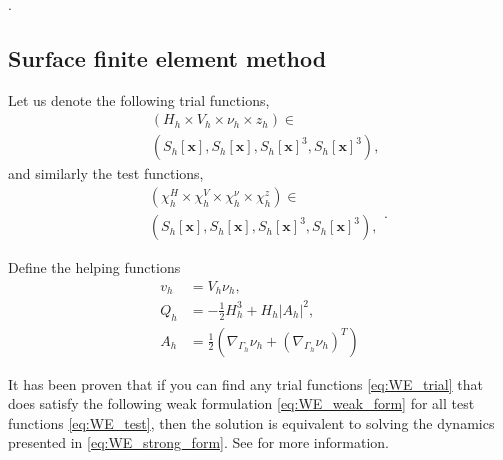.



\subsection{Surface finite element method}%
\label{sub:surface_finite_element_method}

Let us denote the following trial functions,
\begin{equation}
\label{eq:WE_trial}
    \begin{split}
& ( H_{h} \times V_{h} \times \nu_{h}  \times z_{h} ) \in \\
&\left( S_{h}\left[ \mathbf{x} \right],S_{h}\left[ \mathbf{x} \right], S_{h}\left[ \mathbf{x} \right] ^3,S_{h}\left[ \mathbf{x} \right] ^3    \right),
    \end{split}
\end{equation}
and similarly the test functions,
\begin{equation}
\label{eq:WE_test}
    \begin{split}
& ( \chi_{h}^{H}  \times \chi_{h} ^{V} \times \chi_{h} ^{\nu }  \times \chi_{h} ^{z} ) \in \\
&\left( S_{h}\left[ \mathbf{x} \right],S_{h}\left[ \mathbf{x} \right], S_{h}\left[ \mathbf{x} \right] ^3,S_{h}\left[ \mathbf{x} \right] ^3    \right),
    \end{split}
.\end{equation}

Define the helping functions
\[
    \begin{split}
v_{h} & = V_{h}\nu_{h}, \\
Q_{h} & =  - \frac{1}{2} H_{h}^{3} + H_{h} \left\lvert A_{h} \right\rvert^2, \\
A_{h} & = \frac{1}{2}\left( \nabla _{\Gamma_{h} } \nu_{h} + \left( \nabla _{\Gamma _{h}}\nu _{h} \right) ^{T} \right)
    \end{split}
\]


 It has been proven that if you can find any trial functions \eqref{eq:WE_trial} that does satisfy the following weak formulation \eqref{eq:WE_weak_form} for all test functions \eqref{eq:WE_test}, then the solution is equivalent to solving the dynamics presented in \eqref{eq:WE_strong_form}. See \cite{kovacs2021convergent} for more information.

